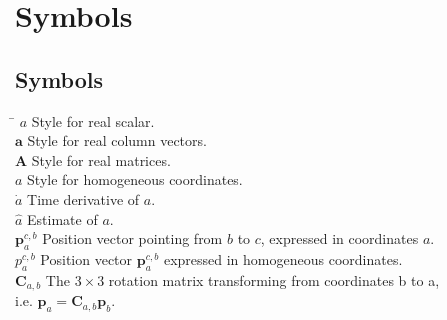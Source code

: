 \chapter*{Symbols}
\label{sec:symbols}

\section*{Symbols}

\begin{tabbing}
 \hspace*{3cm} \= \kill
  $a$                     \> Style for real scalar. \\[0.5ex]
  $\mathbf{a}$            \> Style for real column vectors. \\[0.5ex]
  $\mathbf{A}$            \> Style for real matrices. \\[0.5ex]
  $\mathbf{\textit{a}}$   \> Style for homogeneous coordinates. \\[0.5ex]
  $\dot{a}$               \> Time derivative of $a$. \\[0.5ex]
  $\hat{a}$               \> Estimate of $a$. \\[0.5ex]
  $\mathbf{p}^{c,b}_a$    \> Position vector pointing from $b$ to $c$, expressed in coordinates $a$. \\[0.5ex]
  $\mathbf{\textit{p}}^{c,b}_a$    \> Position vector $\mathbf{p}^{c,b}_a$ expressed in homogeneous coordinates. \\[0.5ex]
  $\mathbf{C}_{a,b}$      \> The $3\times3$ rotation matrix transforming from coordinates b to a, \\ \> i.e. $\mathbf{p}_a=\mathbf{C}_{a,b}\mathbf{p}_b$. \\[0.5ex]
  
\end{tabbing}

